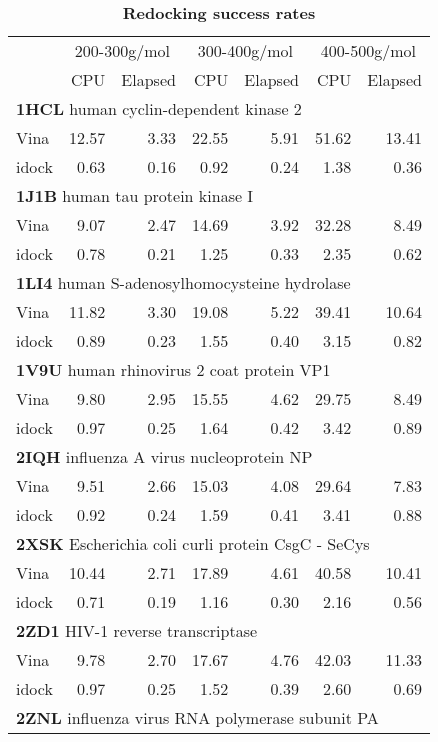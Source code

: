 \documentclass[10pt]{article}
\begin{document}
\begin{table}[!ht]
\caption{
\bf{Redocking success rates}}
\begin{tabular}{lrrrrrr}
\hline
& \multicolumn{2}{c}{200-300g/mol} & \multicolumn{2}{c}{300-400g/mol} & \multicolumn{2}{c}{400-500g/mol}\\
& CPU & Elapsed & CPU & Elapsed & CPU & Elapsed\\
\hline
\multicolumn{7}{l}{\textbf{1HCL} human cyclin-dependent kinase 2}\\
Vina  & 12.57 &  3.33 & 22.55 &  5.91 & 51.62 & 13.41\\
idock &  0.63 &  0.16 &  0.92 &  0.24 &  1.38 &  0.36\\
\multicolumn{7}{l}{\textbf{1J1B} human tau protein kinase I}\\
Vina  &  9.07 &  2.47 & 14.69 &  3.92 & 32.28 &  8.49\\
idock &  0.78 &  0.21 &  1.25 &  0.33 &  2.35 &  0.62\\
\multicolumn{7}{l}{\textbf{1LI4} human S-adenosylhomocysteine hydrolase}\\
Vina  & 11.82 &  3.30 & 19.08 &  5.22 & 39.41 & 10.64\\
idock &  0.89 &  0.23 &  1.55 &  0.40 &  3.15 &  0.82\\
\multicolumn{7}{l}{\textbf{1V9U} human rhinovirus 2 coat protein VP1}\\
Vina  &  9.80 &  2.95 & 15.55 &  4.62 & 29.75 &  8.49\\
idock &  0.97 &  0.25 &  1.64 &  0.42 &  3.42 &  0.89\\
\multicolumn{7}{l}{\textbf{2IQH} influenza A virus nucleoprotein NP}\\
Vina  &  9.51 &  2.66 & 15.03 &  4.08 & 29.64 &  7.83\\
idock &  0.92 &  0.24 &  1.59 &  0.41 &  3.41 &  0.88\\
\multicolumn{7}{l}{\textbf{2XSK} Escherichia coli curli protein CsgC - SeCys}\\
Vina  & 10.44 &  2.71 & 17.89 &  4.61 & 40.58 & 10.41\\
idock &  0.71 &  0.19 &  1.16 &  0.30 &  2.16 &  0.56\\
\multicolumn{7}{l}{\textbf{2ZD1} HIV-1 reverse transcriptase}\\
Vina  &  9.78 &  2.70 & 17.67 &  4.76 & 42.03 & 11.33\\
idock &  0.97 &  0.25 &  1.52 &  0.39 &  2.60 &  0.69\\
\multicolumn{7}{l}{\textbf{2ZNL} influenza virus RNA polymerase subunit PA}\\

\end{tabular}
\end{table}
\end{document}
